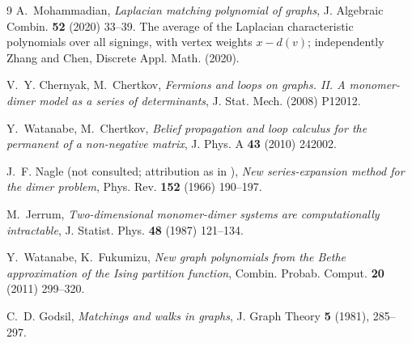 \documentclass[11pt]{article}
\theoremstyle{remark}
\begin{document}
\begin{thebibliography}{9}
 A.~Mohammadian, \emph{Laplacian matching polynomial of graphs},
J. Algebraic Combin. \textbf{52} (2020) 33--39. The average of the Laplacian
characteristic polynomials over all signings, with vertex weights $x-d(v)$;
independently Zhang and Chen, Discrete Appl. Math. (2020).

 V.~Y. Chernyak, M.~Chertkov, \emph{Fermions and loops on graphs.
II. A monomer-dimer model as a series of determinants}, J. Stat. Mech. (2008)
P12012.

 Y.~Watanabe, M.~Chertkov, \emph{Belief propagation and loop calculus
for the permanent of a non-negative matrix}, J. Phys. A \textbf{43} (2010)
242002.

 J.~F. Nagle (not consulted; attribution as in \cite{WF}),
\emph{New series-expansion method for the dimer
problem}, Phys. Rev. \textbf{152} (1966) 190--197.

 M.~Jerrum, \emph{Two-dimensional monomer-dimer systems are
computationally intractable}, J. Statist. Phys. \textbf{48} (1987) 121--134.

 Y.~Watanabe, K.~Fukumizu, \emph{New graph polynomials from the Bethe
approximation of the Ising partition function}, Combin. Probab. Comput.
\textbf{20} (2011) 299--320.

 C.~D. Godsil, \emph{Matchings and walks in graphs},
J. Graph Theory \textbf{5} (1981), 285--297.


\end{thebibliography}
\end{document}
